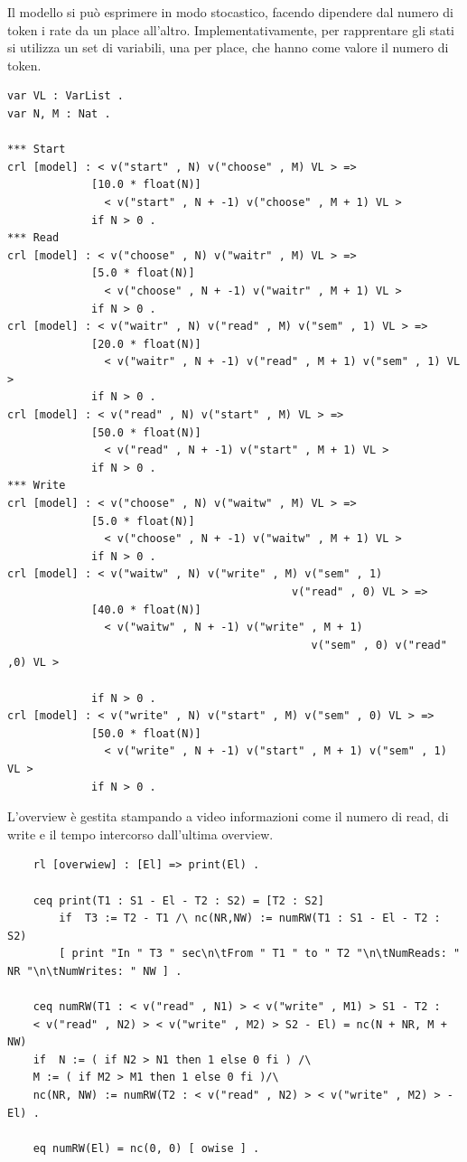 Il modello si può esprimere in modo stocastico, facendo dipendere dal numero di
token i rate da un place all'altro. Implementativamente, per rapprentare gli
stati si utilizza un set di variabili, una per place, che hanno come valore il
numero di token.
\begin{Verbatim}[fontsize=\small]
var VL : VarList .
var N, M : Nat .

*** Start
crl [model] : < v("start" , N) v("choose" , M) VL > =>
             [10.0 * float(N)]
               < v("start" , N + -1) v("choose" , M + 1) VL >
             if N > 0 .
*** Read
crl [model] : < v("choose" , N) v("waitr" , M) VL > =>
             [5.0 * float(N)]
               < v("choose" , N + -1) v("waitr" , M + 1) VL >
             if N > 0 .
crl [model] : < v("waitr" , N) v("read" , M) v("sem" , 1) VL > =>
             [20.0 * float(N)]
               < v("waitr" , N + -1) v("read" , M + 1) v("sem" , 1) VL >
             if N > 0 .
crl [model] : < v("read" , N) v("start" , M) VL > =>
             [50.0 * float(N)]
               < v("read" , N + -1) v("start" , M + 1) VL >
             if N > 0 .
*** Write
crl [model] : < v("choose" , N) v("waitw" , M) VL > =>
             [5.0 * float(N)]
               < v("choose" , N + -1) v("waitw" , M + 1) VL >
             if N > 0 .
crl [model] : < v("waitw" , N) v("write" , M) v("sem" , 1)
                                            v("read" , 0) VL > =>
             [40.0 * float(N)]
               < v("waitw" , N + -1) v("write" , M + 1)
                                               v("sem" , 0) v("read" ,0) VL >
             
             if N > 0 .
crl [model] : < v("write" , N) v("start" , M) v("sem" , 0) VL > =>
             [50.0 * float(N)]
               < v("write" , N + -1) v("start" , M + 1) v("sem" , 1) VL >
             if N > 0 .

\end{Verbatim}
L'overview è gestita stampando a video informazioni come il numero di read, di
write e il tempo intercorso dall'ultima overview.

\begin{verbatim}
	rl [overwiew] : [El] => print(El) .

	ceq print(T1 : S1 - El - T2 : S2) = [T2 : S2]
		if 	T3 := T2 - T1 /\ nc(NR,NW) := numRW(T1 : S1 - El - T2 : S2)
		[ print "In " T3 " sec\n\tFrom " T1 " to " T2 "\n\tNumReads: " NR "\n\tNumWrites: " NW ] .

	ceq numRW(T1 : < v("read" , N1) > < v("write" , M1) > S1 - T2 :
	< v("read" , N2) > < v("write" , M2) > S2 - El) = nc(N + NR, M + NW)
	if	N := ( if N2 > N1 then 1 else 0 fi ) /\
	M := ( if M2 > M1 then 1 else 0 fi )/\
	nc(NR, NW) := numRW(T2 : < v("read" , N2) > < v("write" , M2) > - El) .
	
	eq numRW(El) = nc(0, 0) [ owise ] .
\end{verbatim}

